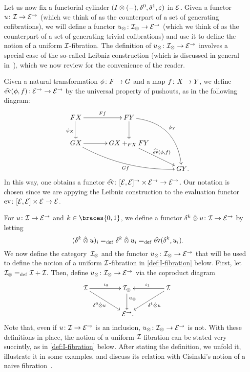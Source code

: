 \documentclass[reqno,10pt,a4paper,oneside,draft]{amsart}
\begin{document}
Let us now fix a functorial cylinder $(\interval \otimes (-), \lcyl, \rcyl, \ccyl)$ in $\calE$.
Given a functor $u \co \cal{I} \to \catE^\to$ (which we think of as the counterpart of a set of generating cofibrations), we will define a functor $u_\otimes \co \cal{I}_\otimes \to \catE^\to$ (which we think of as the counterpart of a set of generating trivial cofibrations) and use it to define the notion of a uniform $\cal{I}$-fibration.
The definition of $u_\otimes \co \cal{I}_\otimes \to \catE^\to$ involves a special case of the so-called Leibniz construction (which is discussed in general in~\cite{riehl-verity:reedy}), which we now review for the convenience of the reader.

Given a natural transformation $\phi \co F \to G$ and a map $f \co X \to Y$, we define $\hateval(\phi, f) \co \catE^\to \to \catE^\to$ by the universal property of pushouts, as in the following diagram:
\begin{gather*}
\xymatrix@C=1.2cm{
  FX \ar[r]^{Ff} \ar[d]_{\phi_X} & FY \ar@/^2pc/[ddr]^{\phi_Y} \ar[d] & \\
  GX \ar@/_1pc/[drr]_{Gf} \ar[r] & GX +_{FX} FY  \ar[dr]^-{\hateval(\phi, f)} & \\
  & & GY
\rlap{.}}
\end{gather*}
In this way, one obtains a functor $\hateval \co [\catE, \catE]^\to \times \catE^\to \to \catE^\to$.
Our notation is chosen since we are appying the Leibniz construction to the evaluation functor $\eval \co [\catE,\catE] \times \calE \to \catE$.

For $u \co \cal{I} \to \catE^\to$ and $k \in \braces{0, 1}$, we define a functor $\kcyl \hatotimes u \co \cal{I} \to \catE^\to$ by letting
\[
(\kcyl \hatotimes u)_i \defeq \kcyl \hatotimes u_i  \defeq \hateval(\kcyl, u_i)  \rlap{.}
\]
We now define the category~$\cal{I}_\otimes$ and the functor $u_\otimes \co \cal{I}_\otimes \to \catE^\to$ that will be used to define the notion of a uniform $\cal{I}$-fibration in \cref{def:I-fibration} below.
First, let $\cal{I}_\otimes \defeq \cal{I} + \cal{I}$.
Then, define $u_\otimes \co \cal{I}_\otimes \to \catE^\to$ via the coproduct diagram
\begin{equation}
\label{equ:u-tensor}
\begin{gathered}
\xymatrix@C+2em{
  \cal{I} \ar[r]^{\iota_0} \ar[dr]_-{\lcyl \hatotimes u} & \cal{I}_\otimes \ar[d]^(.4){u_\otimes} & \cal{I} \ar[dl]^-{\rcyl \hatotimes u} \ar[l]_{\iota_1} \\
  & \catE^\to
\rlap{.}}
\end{gathered}
\end{equation}
Note that, even if $u \co \cal{I} \to \catE^\to$ is an inclusion, $u_\otimes \co \cal{I}_\otimes \to \catE^\to$ is not.
With these definitions in place, the notion of a uniform $\cal{I}$-fibration can be stated very succintly, as in \cref{def:I-fibration} below.
After stating the definition, we unfold it, illustrate it in some examples, and discuss its relation with Cisinski's notion of a 
naive fibration~\cite{cisinski-asterisque}.
\end{document}
